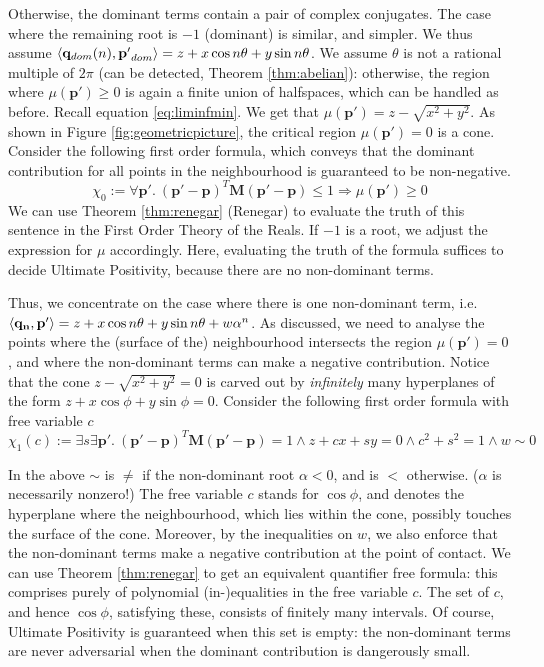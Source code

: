 Otherwise, the dominant terms contain a pair of complex conjugates. The case where the remaining root is $-1$ (dominant) is similar, and simpler. We thus assume $\langle\mathbf{q}_{dom}(n), \mathbf{p'}_{dom}\rangle = z + x\cos n\theta + y\sin n\theta$. We assume $\theta$ is not a rational multiple of $2\pi$ (can be detected, Theorem \ref{thm:abelian}): otherwise, the region where $\mu(\mathbf{p'}) \ge 0$ is again a finite union of halfspaces, which can be handled as before. Recall equation \ref{eq:liminfmin}. We get that $\mu(\mathbf{p'}) = z -\sqrt{x^2 + y^2}$. As shown in Figure \ref{fig:geometricpicture}, the critical region $\mu(\mathbf{p'}) = 0$ is a cone. Consider the following first order formula, which conveys that the dominant contribution for all points in the neighbourhood is guaranteed to be non-negative.
\begin{equation}
\label{eq:firsttask}
\chi_0 := \forall \mathbf{p'}.~ (\mathbf{p'} - \mathbf{p})^T\mathbf{M}(\mathbf{p'} - \mathbf{p}) \le 1 \Rightarrow \mu(\mathbf{p'}) \ge 0
\end{equation}
We can use Theorem \ref{thm:renegar} (Renegar) to evaluate the truth of this sentence in the First Order Theory of the Reals. If $-1$ is a root, we adjust the expression for $\mu$ accordingly. Here, evaluating the truth of the formula suffices to decide Ultimate Positivity, because there are no non-dominant terms.

Thus, we concentrate on the case where there is one non-dominant term, i.e. $\langle\mathbf{q_n}, \mathbf{p'}\rangle = z + x\cos n\theta + y\sin n\theta + w\alpha^n$. As discussed, we need to analyse the points where the (surface of the) neighbourhood intersects the region $\mu(\mathbf{p'}) = 0$, and where the non-dominant terms can make a negative contribution. Notice that the cone $z - \sqrt{x^2 + y^2} = 0$ is carved out by \textit{infinitely} many hyperplanes of the form $z + x\cos\phi + y\sin\phi = 0$. Consider the following first order formula with free variable $c$
\begin{equation}
\label{eq:intersection}
\chi_1(c):= \exists s \exists \mathbf{p'}.~ (\mathbf{p'} - \mathbf{p})^T\mathbf{M}(\mathbf{p'} - \mathbf{p}) = 1 \land z + cx + sy = 0 \land c^2 + s^2 = 1 \land w \sim 0
\end{equation}

In the above $\sim$ is $\ne$ if the non-dominant root $\alpha < 0$, and is $<$ otherwise. ($\alpha$ is necessarily nonzero!) The free variable $c$ stands for $\cos \phi$, and denotes the hyperplane where the neighbourhood, which lies within the cone, possibly touches the surface of the cone. Moreover, by the inequalities on $w$, we also enforce that the non-dominant terms make a negative contribution at the point of contact. We can use Theorem \ref{thm:renegar} to get an equivalent quantifier free formula: this comprises purely of polynomial (in-)equalities in the free variable $c$. The set of $c$, and hence $\cos \phi$, satisfying these, consists of finitely many intervals. Of course, Ultimate Positivity is guaranteed when this set is empty: the non-dominant terms are never adversarial when the dominant contribution is dangerously small.

